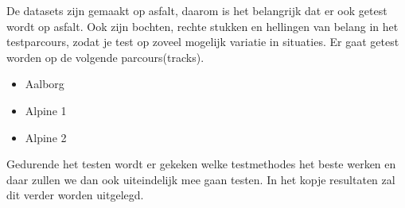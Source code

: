 De datasets zijn gemaakt op asfalt, daarom is het belangrijk dat er ook getest wordt op asfalt. Ook zijn bochten, rechte stukken en hellingen van belang in het testparcours, zodat je test op zoveel mogelijk variatie in situaties. Er gaat getest worden op de volgende parcours(tracks).
\begin{itemize}
\item Aalborg
\item Alpine 1
\item Alpine 2
\end{itemize}
Gedurende het testen wordt er gekeken welke testmethodes het beste werken en daar zullen we dan ook uiteindelijk mee gaan testen. In het kopje resultaten zal dit verder worden uitgelegd. 
